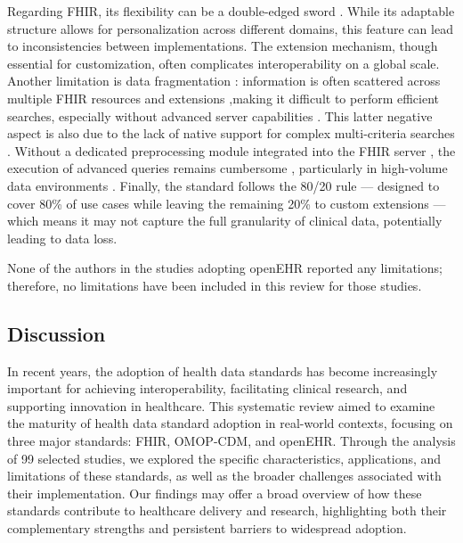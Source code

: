 Regarding FHIR, its flexibility can be a double-edged sword \cite{xiao_development_2021,sinaci2023data,kramer_reducing_2022}. While its adaptable structure allows for personalization across different domains, this feature can lead to inconsistencies between implementations. The extension mechanism, though essential for customization, often complicates interoperability on a global scale. Another limitation is data fragmentation \cite{gonzalez-castro_caside_2021}: information is often scattered across multiple FHIR resources and extensions \cite{xiao_development_2021},making it difficult to perform efficient searches, especially without advanced server capabilities \cite{bennett2023mimic}. This latter negative aspect is also due to the lack of native support for complex multi-criteria searches \cite{gruendner_framework_2021}. Without a dedicated preprocessing module integrated into the FHIR server \cite{song_implementation_2023}, the execution of advanced queries remains cumbersome \cite{gruendner_architecture_2022}, particularly in high-volume data environments \cite{gruendner_framework_2021}. Finally, the standard follows the 80/20 rule \cite{stellmach_creation_2023} --- designed to cover 80\% of use cases while leaving the remaining 20\% to custom extensions --- which means it may not capture the full granularity of clinical data, potentially leading to data loss.

None of the authors in the studies adopting openEHR reported any limitations; therefore, no limitations have been included in this review for those studies.

\subsection{Discussion}
\label{sec:paper1_discussion}

In recent years, the adoption of health data standards has become increasingly important for achieving interoperability, facilitating clinical research, and supporting innovation in healthcare. This systematic review aimed to examine the maturity of health data standard adoption in real-world contexts, focusing on three major standards: FHIR, OMOP-CDM, and openEHR. Through the analysis of 99 selected studies, we explored the specific characteristics, applications, and limitations of these standards, as well as the broader challenges associated with their implementation. Our findings may offer a broad overview of how these standards contribute to healthcare delivery and research, highlighting both their complementary strengths and persistent barriers to widespread adoption.


